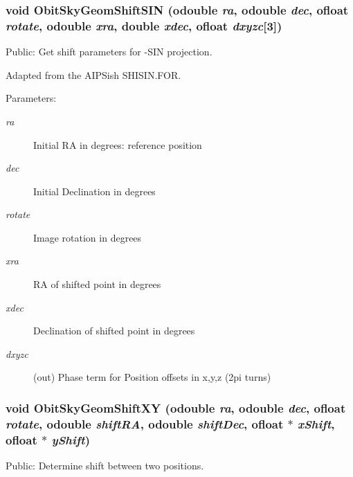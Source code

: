 \subsubsection{\setlength{\rightskip}{0pt plus 5cm}void Obit\-Sky\-Geom\-Shift\-SIN ({\bf odouble} {\em ra}, {\bf odouble} {\em dec}, {\bf ofloat} {\em rotate}, {\bf odouble} {\em xra}, double {\em xdec}, {\bf ofloat} {\em dxyzc}[3])}\label{ObitSkyGeom_8h_a10}


Public: Get shift parameters for -SIN projection. 

Adapted from the AIPSish SHISIN.FOR. \begin{Desc}
\item[Parameters:]
\begin{description}
\item[{\em ra}]Initial RA in degrees: reference position \item[{\em dec}]Initial Declination in degrees \item[{\em rotate}]Image rotation in degrees \item[{\em xra}]RA of shifted point in degrees \item[{\em xdec}]Declination of shifted point in degrees \item[{\em dxyzc}](out) Phase term for Position offsets in x,y,z (2pi turns) \end{description}
\end{Desc}
\subsubsection{\setlength{\rightskip}{0pt plus 5cm}void Obit\-Sky\-Geom\-Shift\-XY ({\bf odouble} {\em ra}, {\bf odouble} {\em dec}, {\bf ofloat} {\em rotate}, {\bf odouble} {\em shift\-RA}, {\bf odouble} {\em shift\-Dec}, {\bf ofloat} $\ast$ {\em x\-Shift}, {\bf ofloat} $\ast$ {\em y\-Shift})}\label{ObitSkyGeom_8h_a8}


Public: Determine shift between two positions. 

